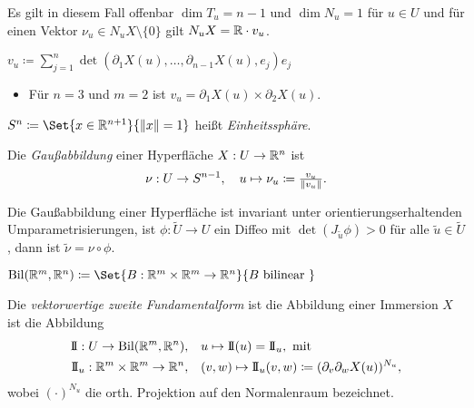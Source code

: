 \documentclass{cheat-sheet}
\DeclareMathOperator{\Bil}{Bil} %
\newcommand{\FFII}{\mathrm{I\!I}} %
\begin{document}
\begin{bem}
  Es gilt in diesem Fall offenbar $\dim T_u = n - 1$ und $\dim N_u = 1$ für $u \in U$ und für einen Vektor $\nu_u \in N_u X \setminus \{ 0 \}$ gilt $N_u X = \mathbb{R} \cdot v_u$.
\end{bem}

\begin{defn}
  $v_u \coloneqq \sum_{j=1}^{n} \det(\partial_1 X(u), \ldots, \partial_{n-1} X(u), e_j) e_j$
\end{defn}

\begin{bem}
   \enspace
  \begin{itemize}
    \item Für $n = 3$ und $m = 2$ ist $v_u = \partial_1 X(u) \times \partial_2 X(u)$.
  \end{itemize}
\end{bem}

\begin{nota}
  $S^{n} \coloneqq \Set{x \in \R^{n+1}}{\norm{x} = 1}$ heißt \emph{Einheitssphäre}.
\end{nota}

\begin{defn}
  Die \emph{Gaußabbildung} einer Hyperfläche $X : U \to \mathbb{R}^n$ ist
  \[
    \nu : U \to S^{n-1}, \quad u \mapsto \nu_u \coloneqq \tfrac{v_u}{\lVert v_u\rVert}.
  \]
\end{defn}

\begin{satz}
  Die Gaußabbildung einer Hyperfläche ist invariant unter orientierungserhaltenden Umparametrisierungen, \dh{} ist $\phi : \tilde{U} \to U$ ein Diffeo mit $\det(J_{\tilde{u}} \phi) > 0$ für alle $\tilde{u} \in \tilde{U}$, dann ist $\tilde{\nu} = \nu \circ \phi$.
\end{satz}


\begin{nota}
  $\Bil(\R^m, \R^n) \coloneqq \Set{ B : \R^m \times \R^m \to \R^n }{ B \text{ bilinear } }$
\end{nota}

\begin{defn}
  Die \emph{vektorwertige zweite Fundamentalform} ist die Abbildung einer Immersion $X$ ist die Abbildung
  \begin{align*}
    \FFII : U \to \Bil(\R^m, \R^n), \quad & u \mapsto \FFII(u) = \FFII_u, \text { mit } \\
    \FFII_u : \R^m \times \R^m \to \R^n, \quad & (v, w) \mapsto \FFII_u(v, w) \coloneqq (\partial_v \partial_w X(u))^{N_u},
  \end{align*}
  wobei $(\cdot)^{N_u}$ die orth. Projektion auf den Normalenraum bezeichnet.
\end{defn}
\end{document}
